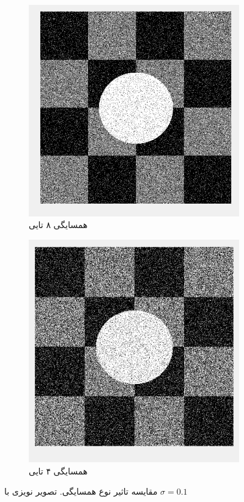 \documentclass[11.5pt,a4paper]{article}
\begin{document}
\begin{figure}[h]
\center
	\begin{subfigure}{0.4\textwidth}
	\includegraphics[scale=0.3]{Imgs/MRF_S1_BetaV_Res.png}
	\caption{همسایگی ۸ تایی}
	\end{subfigure}
	\begin{subfigure}{0.4\textwidth}
	\includegraphics[scale=0.3]{Imgs/MRF_Neig4.png}
	\caption{همسایگی ۴ تایی}
	\end{subfigure}	
\caption{مقایسه تاثیر نوع همسایگی. تصویر نویزی با $\sigma=0.1$}
\label{fig:Neigh}
\end{figure}
\end{document}
